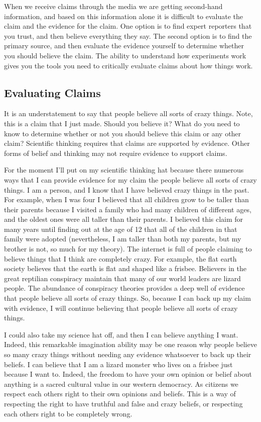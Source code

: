  When we receive claims through the media we are getting second-hand information, and based on this information alone it is difficult to evaluate the claim and the evidence for the claim. One option is to find expert reporters that you trust, and then believe everything they say. The second option is to find the primary source, and then evaluate the evidence yourself to determine whether you should believe the claim. The ability to understand how experiments work gives you the tools you need to critically evaluate claims about how things work.

\subsection{Evaluating Claims}

It is an understatement to say that people believe all sorts of crazy things. Note, this is a claim that I just made. Should you believe it? What do you need to know to determine whether or not you should believe this claim or any other claim? Scientific thinking requires that claims are supported by evidence. Other forms of belief and thinking may not require evidence to support claims.

For the moment I'll put on my scientific thinking hat because there numerous ways that I can provide evidence for my claim the people believe all sorts of crazy things. I am a person, and I know that I have believed crazy things in the past. For example, when I was four I believed that all children grow to be taller than their parents because I visited a family who had many children of different ages, and the oldest ones were all taller than their parents. I believed this claim for many years until finding out at the age of 12 that all of the children in that family were adopted (nevertheless, I am taller than both my parents, but my brother is not, so much for my theory). The internet is full of people claiming to believe things that I think are completely crazy. For example, the flat earth society believes that the earth is flat and shaped like a frisbee. Believers in the great reptilian conspiracy maintain that many of our world leaders are lizard people. The abundance of conspiracy theories provides a deep well of evidence that people believe all sorts of crazy things. So, because I can back up my claim with evidence, I will continue believing that people believe all sorts of crazy things.

I could also take my science hat off, and then I can believe anything I want. Indeed, this remarkable imagination ability may be one reason why people believe so many crazy things without needing any evidence whatsoever to back up their beliefs. I can believe that I am a lizard monster who lives on a frisbee just because I want to. Indeed, the freedom to have your own opinion or belief about anything is a sacred cultural value in our western democracy. As citizens we respect each others right to their own opinions and beliefs. This is a way of respecting the right to have truthful and false and crazy beliefs, or respecting each others right to be completely wrong.

